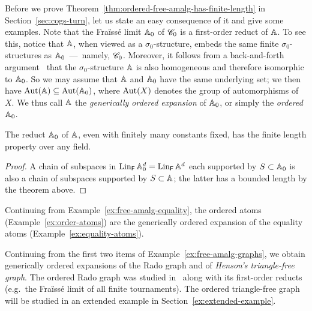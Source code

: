 Before we prove Theorem~\ref{thm:ordered-free-amalg-has-finite-length} in Section~\ref{sec:cogs-turn}, let us state an easy consequence of it and give some examples.
Note that the Fraïssé limit $\mathbb{A}_0$ of $\mathscr{C}_0$ is a first-order reduct of $\mathbb{A}$.
To see this, notice that $\mathbb{A}$, when viewed as a $\sigma_0$-structure, embeds the same finite $\sigma_0$-structures as $\mathbb{A}_0$~---~namely, $\mathscr{C}_0$.
Moreover, it follows from a back-and-forth argument~\cite[Lem.~7.1.4]{hodges1993model} that the $\sigma_0$-structure $\mathbb{A}$ is also homogeneous and therefore isomorphic to $\mathbb{A}_0$.
So we may assume that $\mathbb{A}$ and $\mathbb{A}_0$ have the same underlying set; we then have $\operatorname{Aut}(\mathbb{A}) \subseteq \operatorname{Aut}(\mathbb{A}_0)$, where $\operatorname{Aut}(X)$ denotes the group of automorphisms of $X$.
We thus call $\mathbb{A}$ the \emph{generically ordered expansion} of $\mathbb{A}_0$, or simply the \emph{ordered $\mathbb{A}_0$}.
\begin{corollary}\label{cor:free-finite-length}
    The reduct $\mathbb{A}_0$ of $\mathbb{A}$, even with finitely many constants fixed, has the finite length property over any field.
\end{corollary}
\begin{proof}
    A chain of subspaces in $\operatorname{Lin}_{\mathsf{F}} \mathbb{A}_0^d = \operatorname{Lin}_{\mathsf{F}} \mathbb{A}^d$ each supported by $S \subset \mathbb{A}_0$ is also a chain of subspaces supported by $S \subset \mathbb{A}$; 
    the latter has a bounded length by the theorem above.
\end{proof}

\begin{example}\label{ex:generically-ordered-equality}
    Continuing from Example~\ref{ex:free-amalg-equality},
    the ordered atoms (Example~\ref{ex:order-atoms}) are the generically ordered expansion of the equality atoms (Example~\ref{ex:equality-atoms}).
\lipicsEnd\end{example}

\begin{example}\label{ex:generically-ordered-graphs}
    Continuing from the first two items of Example~\ref{ex:free-amalg-graphs}, we obtain generically ordered expansions of the Rado graph and of \emph{Henson's triangle-free graph}.
    The ordered Rado graph was studied in~\cite{BPP15} along with its first-order reducts (e.g.~the Fraïssé limit of all finite tournaments). The ordered triangle-free graph will be studied in an extended example in Section~\ref{ex:extended-example}.
\lipicsEnd\end{example}

